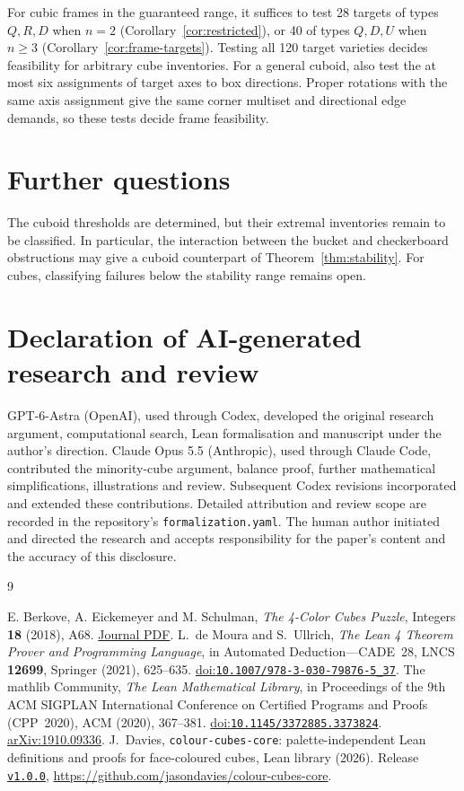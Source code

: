 \documentclass[11pt]{article}
\theoremstyle{remark}
\begin{document}
For cubic frames in the guaranteed range, it suffices to test 28 targets
of types $Q,R,D$ when $n=2$ (Corollary~\ref{cor:restricted}), or 40 of types
$Q,D,U$ when $n\ge3$ (Corollary~\ref{cor:frame-targets}). Testing all 120
target varieties decides feasibility for arbitrary cube inventories.
For a general cuboid, also test the at most six assignments of target axes
to box directions. Proper rotations with the same axis assignment give
the same corner multiset and directional edge demands, so these tests
decide frame feasibility.

\section*{Further questions}
The cuboid thresholds are determined, but their extremal inventories
remain to be classified. In particular, the interaction between the
bucket and checkerboard obstructions may give a cuboid counterpart of
Theorem~\ref{thm:stability}. For cubes, classifying failures below the
stability range remains open.
\section*{Declaration of AI-generated research and review}
GPT-6-Astra (OpenAI), used through Codex, developed the original research
argument, computational search, Lean formalisation and manuscript under
the author's direction. Claude Opus 5.5 (Anthropic), used through Claude
Code, contributed the minority-cube argument, balance proof, further
mathematical simplifications, illustrations and review. Subsequent Codex
revisions incorporated and extended these contributions. Detailed attribution
and review scope are recorded in the repository's \texttt{formalization.yaml}.
The human author initiated and directed the research and accepts responsibility
for the paper's content and the accuracy of this disclosure.

\appendix


\begin{thebibliography}{9}
\raggedright
{}
E. Berkove, A. Eickemeyer and M. Schulman,
\emph{The 4-Color Cubes Puzzle}, Integers \textbf{18} (2018), A68.
\href{https://math.colgate.edu/~integers/s68/s68.pdf}{Journal PDF}.
 L.~de Moura and S.~Ullrich,
\emph{The Lean 4 Theorem Prover and Programming Language},
in Automated Deduction---CADE~28, LNCS \textbf{12699}, Springer (2021),
625--635.
\href{https://doi.org/10.1007/978-3-030-79876-5_37}{doi:\nolinkurl{10.1007/978-3-030-79876-5_37}}.
 The mathlib Community,
\emph{The Lean Mathematical Library},
in Proceedings of the 9th ACM SIGPLAN International Conference on
Certified Programs and Proofs (CPP~2020), ACM (2020), 367--381.
\href{https://doi.org/10.1145/3372885.3373824}{doi:\nolinkurl{10.1145/3372885.3373824}}.
\href{https://arxiv.org/abs/1910.09336}{arXiv:1910.09336}.
 J.~Davies,
\texttt{colour-cubes-core}: palette-independent Lean definitions and proofs
for face-coloured cubes, Lean library (2026).
Release \href{https://github.com/jasondavies/colour-cubes-core/tree/v1.0.0}{\texttt{v1.0.0}},
\url{https://github.com/jasondavies/colour-cubes-core}.
\end{thebibliography}
\end{document}
